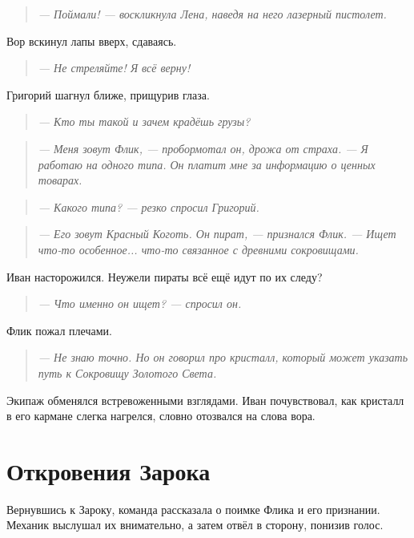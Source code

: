 \documentclass[12pt,a4paper]{book}
\newenvironment{dialogue}{\begin{quote}\itshape}{\end{quote}}
\begin{document}
\begin{dialogue}
--- Поймали! --- воскликнула Лена, наведя на него лазерный пистолет.
\end{dialogue}

Вор вскинул лапы вверх, сдаваясь.

\begin{dialogue}
--- Не стреляйте! Я всё верну!
\end{dialogue}

Григорий шагнул ближе, прищурив глаза.

\begin{dialogue}
--- Кто ты такой и зачем крадёшь грузы?
\end{dialogue}

\begin{dialogue}
--- Меня зовут Флик, --- пробормотал он, дрожа от страха. --- Я работаю на одного типа. Он платит мне за информацию о ценных товарах.
\end{dialogue}

\begin{dialogue}
--- Какого типа? --- резко спросил Григорий.
\end{dialogue}

\begin{dialogue}
--- Его зовут Красный Коготь. Он пират, --- признался Флик. --- Ищет что-то особенное... что-то связанное с древними сокровищами.
\end{dialogue}

Иван насторожился. Неужели пираты всё ещё идут по их следу?

\begin{dialogue}
--- Что именно он ищет? --- спросил он.
\end{dialogue}

Флик пожал плечами.

\begin{dialogue}
--- Не знаю точно. Но он говорил про кристалл, который может указать путь к Сокровищу Золотого Света.
\end{dialogue}

Экипаж обменялся встревоженными взглядами. Иван почувствовал, как кристалл в его кармане слегка нагрелся, словно отозвался на слова вора.

\section*{Откровения Зарока}

Вернувшись к Зароку, команда рассказала о поимке Флика и его признании. Механик выслушал их внимательно, а затем отвёл в сторону, понизив голос.
\end{document}
